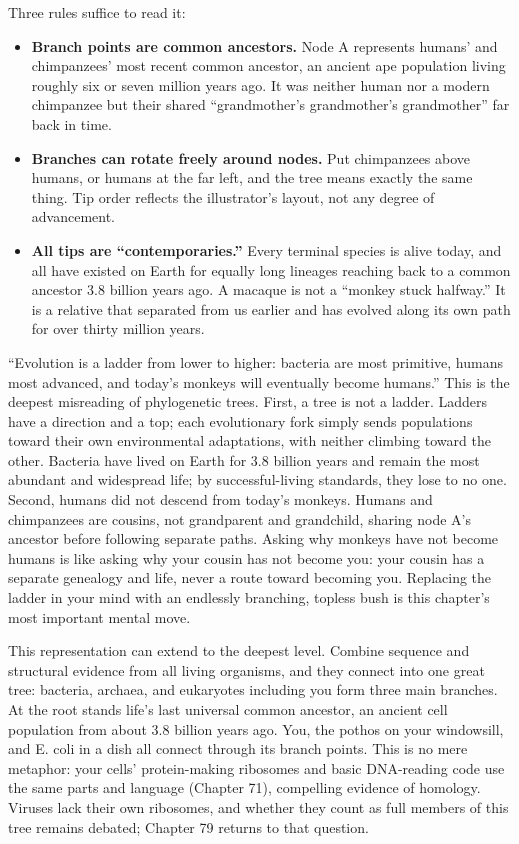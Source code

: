 Three rules suffice to read it:

\begin{itemize}[itemsep=2pt]
\item \textbf{Branch points are common ancestors.} Node A represents humans' and chimpanzees' most recent common ancestor, an ancient ape population living roughly six or seven million years ago. It was neither human nor a modern chimpanzee but their shared ``grandmother's grandmother's grandmother'' far back in time.
\item \textbf{Branches can rotate freely around nodes.} Put chimpanzees above humans, or humans at the far left, and the tree means exactly the same thing. Tip order reflects the illustrator's layout, not any degree of advancement.
\item \textbf{All tips are ``contemporaries.''} Every terminal species is alive today, and all have existed on Earth for equally long lineages reaching back to a common ancestor 3.8 billion years ago. A macaque is not a ``monkey stuck halfway.'' It is a relative that separated from us earlier and has evolved along its own path for over thirty million years.
\end{itemize}

\begin{wuqu}
``Evolution is a ladder from lower to higher: bacteria are most primitive, humans most advanced, and today's monkeys will eventually become humans.'' This is the deepest misreading of phylogenetic trees. First, a tree is not a ladder. Ladders have a direction and a top; each evolutionary fork simply sends populations toward their own environmental adaptations, with neither climbing toward the other. Bacteria have lived on Earth for 3.8 billion years and remain the most abundant and widespread life; by successful-living standards, they lose to no one. Second, humans did not descend from today's monkeys. Humans and chimpanzees are cousins, not grandparent and grandchild, sharing node A's ancestor before following separate paths. Asking why monkeys have not become humans is like asking why your cousin has not become you: your cousin has a separate genealogy and life, never a route toward becoming you. Replacing the ladder in your mind with an endlessly branching, topless bush is this chapter's most important mental move.
\end{wuqu}

This representation can extend to the deepest level. Combine sequence and structural evidence from all living organisms, and they connect into one great tree: bacteria, archaea, and eukaryotes including you form three main branches. At the root stands life's last universal common ancestor, an ancient cell population from about 3.8 billion years ago. You, the pothos on your windowsill, and E. coli in a dish all connect through its branch points. This is no mere metaphor: your cells' protein-making ribosomes and basic DNA-reading code use the same parts and language (Chapter 71), compelling evidence of homology. Viruses lack their own ribosomes, and whether they count as full members of this tree remains debated; Chapter 79 returns to that question.

